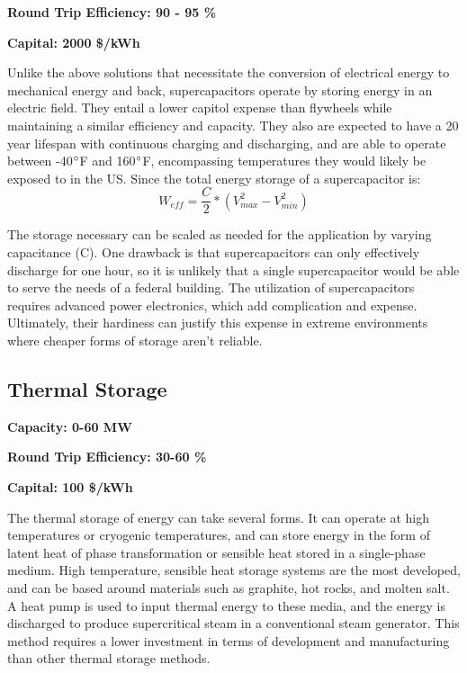 \noindent\textbf{Round Trip Efficiency: 90 - 95 \%}

\noindent\textbf{Capital: 2000 \$/kWh}

Unlike the above solutions that necessitate the conversion of electrical energy
to mechanical energy and back, supercapacitors operate by storing energy in an
electric field. They entail a lower capitol expense than flywheels while
maintaining a similar efficiency and capacity. They also are expected to have a
20 year lifespan with continuous charging and discharging, and are able to
operate between -40$\degree$F and 160$\degree$F, encompassing temperatures they
would likely be exposed to in the US. Since the total energy storage of a supercapacitor is:
\begin{equation}
W_{eff}=\frac{C}{2}*(V^2_{max}-V^2_{min})
\end{equation}

The storage necessary can be scaled as needed for the application by varying
capacitance (C). One drawback is that supercapacitors can only effectively
discharge for one hour, so it is unlikely that a single supercapacitor would be
able to serve the needs of a federal building. The utilization of
supercapacitors requires advanced power electronics, which add complication and
expense. Ultimately, their hardiness can justify this expense in extreme
environments where cheaper forms of storage aren’t reliable.


\subsection{Thermal Storage}
\textbf{Capacity: 0-60 MW}

\noindent\textbf{Round Trip Efficiency: 30-60 \%} 

\noindent\textbf{Capital: 100 \$/kWh}

The thermal storage of energy can take several forms. It can operate at high
temperatures or cryogenic temperatures, and can store energy in the form of
latent heat of phase transformation or sensible heat stored in a single-phase
medium. High temperature, sensible heat storage systems are the most developed,
and can be based around materials such as graphite, hot rocks, and molten salt.
A heat pump is used to input thermal energy to these media, and the energy is
discharged to produce supercritical steam in a conventional steam generator.
This method requires a lower investment in terms of development and
manufacturing than other thermal storage methods.
 
